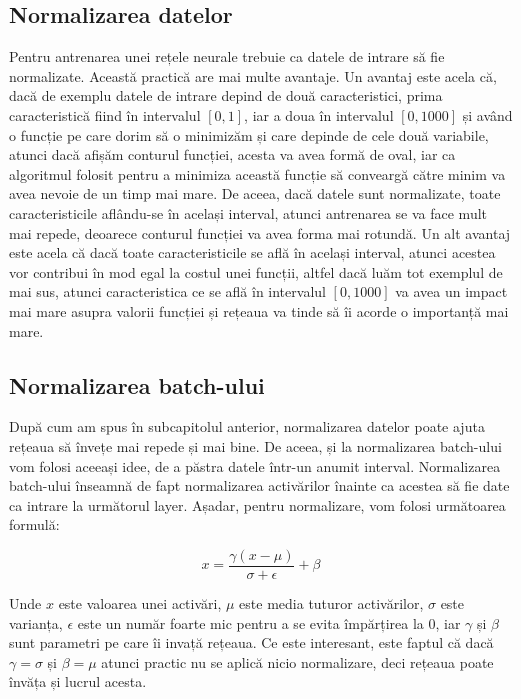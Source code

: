 \subsection{Normalizarea datelor}
\label{sb:normalize}
\cite{coursera_deep_learning} Pentru antrenarea unei rețele neurale trebuie ca datele de intrare să fie normalizate. Această practică are mai multe avantaje. Un avantaj este acela că, dacă de exemplu datele de intrare depind de două caracteristici, prima caracteristică fiind în intervalul $[0, 1]$, iar a doua în intervalul $[0, 1000]$ și având o funcție pe care dorim să o minimizăm și care depinde de cele două variabile, atunci dacă afișăm conturul funcției, acesta va avea formă de oval, iar ca algoritmul folosit pentru a minimiza această funcție să conveargă către minim va avea nevoie de un timp mai mare. De aceea, dacă datele sunt normalizate, toate caracteristicile aflându-se în același interval, atunci antrenarea se va face mult mai repede, deoarece conturul funcției va avea forma mai rotundă. Un alt avantaj este acela că dacă toate caracteristicile se află în același interval, atunci acestea vor contribui în mod egal la costul unei funcții, altfel dacă luăm tot exemplul de mai sus, atunci caracteristica ce se află în intervalul $[0, 1000]$ va avea un impact mai mare asupra valorii funcției și rețeaua va tinde să îi acorde o importanță mai mare.

\subsection{Normalizarea batch-ului}
\label{sb:batch_norm}
\cite{coursera_deep_learning} După cum am spus în subcapitolul anterior, normalizarea datelor poate ajuta rețeaua să învețe mai repede și mai bine. De aceea, și la normalizarea batch-ului vom folosi aceeași idee, de a păstra datele într-un anumit interval. Normalizarea batch-ului înseamnă de fapt normalizarea activărilor înainte ca acestea să fie date ca intrare la următorul layer. Așadar, pentru normalizare, vom folosi următoarea formulă:

\begin{equation}
x = \frac{\gamma(x - \mu)}{\sigma + \epsilon} + \beta
\end{equation}

Unde $x$ este valoarea unei activări, $\mu$ este media tuturor activărilor, $\sigma$ este varianța, $\epsilon$ este un număr foarte mic pentru a se evita împărțirea la 0, iar $\gamma$ și $\beta$ sunt parametri pe care îi invață rețeaua. Ce este interesant, este faptul că dacă $\gamma = \sigma$ și $\beta = \mu$ atunci practic nu se aplică nicio normalizare, deci rețeaua poate învăța și lucrul acesta.

